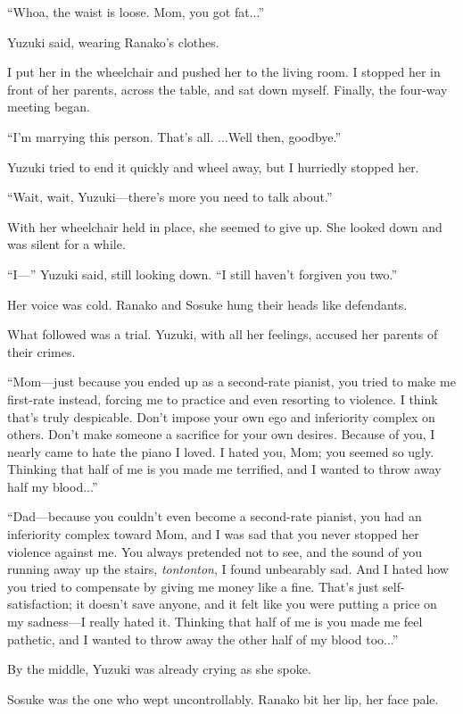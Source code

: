 \documentclass[
    a4paper,
    12pt,
    twoside,
    openany,
    UTF8,
    fontset=windows
]{ctexbook}
\begin{document}
``Whoa, the waist is loose. Mom, you got fat...''

Yuzuki said, wearing Ranako's clothes.

I put her in the wheelchair and pushed her to the living room. I stopped her in front of her parents, across the table, and sat down myself. Finally, the four-way meeting began.

``I'm marrying this person. That's all. ...Well then, goodbye.''

Yuzuki tried to end it quickly and wheel away, but I hurriedly stopped her.

``Wait, wait, Yuzuki---there's more you need to talk about.''

With her wheelchair held in place, she seemed to give up. She looked down and was silent for a while.

``I---'' Yuzuki said, still looking down. ``I still haven't forgiven you two.''

Her voice was cold. Ranako and Sosuke hung their heads like defendants.

What followed was a trial. Yuzuki, with all her feelings, accused her parents of their crimes.

``Mom---just because you ended up as a second-rate pianist, you tried to make me first-rate instead, forcing me to practice and even resorting to violence. I think that's truly despicable. Don't impose your own ego and inferiority complex on others. Don't make someone a sacrifice for your own desires. Because of you, I nearly came to hate the piano I loved. I hated you, Mom; you seemed so ugly. Thinking that half of me is you made me terrified, and I wanted to throw away half my blood...''

``Dad---because you couldn't even become a second-rate pianist, you had an inferiority complex toward Mom, and I was sad that you never stopped her violence against me. You always pretended not to see, and the sound of you running away up the stairs, \textit{tontonton}, I found unbearably sad. And I hated how you tried to compensate by giving me money like a fine. That's just self-satisfaction; it doesn't save anyone, and it felt like you were putting a price on my sadness—I really hated it. Thinking that half of me is you made me feel pathetic, and I wanted to throw away the other half of my blood too...''

By the middle, Yuzuki was already crying as she spoke.

Sosuke was the one who wept uncontrollably. Ranako bit her lip, her face pale.
\end{document}
